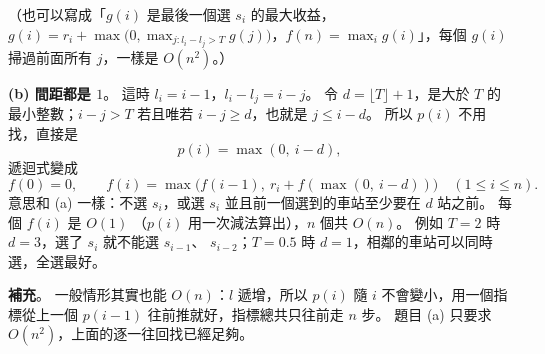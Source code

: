 \begin{pastsoln}
（也可以寫成「$g(i)$ 是最後一個選 $s_i$ 的最大收益，$g(i) = r_i + \max\bigl(0, \max_{j : l_i - l_j > T}
g(j)\bigr)$，$f(n) = \max_i g(i)$」，每個 $g(i)$ 掃過前面所有 $j$，一樣是 $O(n^2)$。）

\textbf{(b) 間距都是 $1$}。 這時 $l_i = i - 1$，$l_i - l_j = i - j$。 令 $d = \lfloor T \rfloor + 1$，是大於
$T$ 的最小整數；$i - j > T$ 若且唯若 $i - j \ge d$，也就是 $j \le i - d$。 所以 $p(i)$ 不用找，直接是
\[
p(i) = \max(0,\ i - d),
\]
遞迴式變成
\[
f(0) = 0, \qquad f(i) = \max\bigl(f(i - 1),\ r_i + f(\max(0,\ i - d))\bigr) \quad (1 \le i \le n).
\]
意思和 (a) 一樣：不選 $s_i$，或選 $s_i$ 並且前一個選到的車站至少要在 $d$ 站之前。 每個 $f(i)$ 是 $O(1)$
（$p(i)$ 用一次減法算出），$n$ 個共 $O(n)$。 例如 $T = 2$ 時 $d = 3$，選了 $s_i$ 就不能選 $s_{i-1}$、
$s_{i-2}$；$T = 0.5$ 時 $d = 1$，相鄰的車站可以同時選，全選最好。

\textbf{補充}。 一般情形其實也能 $O(n)$：$l$ 遞增，所以 $p(i)$ 隨 $i$ 不會變小，用一個指標從上一個
$p(i - 1)$ 往前推就好，指標總共只往前走 $n$ 步。 題目 (a) 只要求 $O(n^2)$，上面的逐一往回找已經足夠。
\end{pastsoln}
